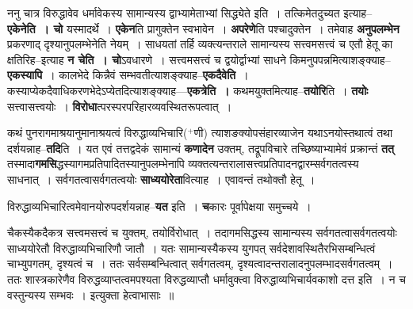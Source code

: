 \documentclass[article,12pt,a4paper]{memoir}
\newcommand{\add}[1]{($^{+}$#1)}
\begin{document}
	  \pstart ननु चात्र विरुद्धावेव धर्मावेकस्य सामान्यस्य द्वाभ्यामेताभ्यां सिद्ध्येते इति । तत्किमेतदुच्यत इत्याह--\textbf{एकेनेति । चो} यस्मादर्थे । \textbf{एकेन}ति प्रागुक्तेन स्वभावेन । \textbf{अपरेणे}ति पश्चादुक्तेन । तमेवाह \textbf{अनुपलम्भेन} प्रकरणाद् दृश्यानुपलम्भेनेति नेयम् । साधयतां तर्हि व्यक्त्यन्तराले सामान्यस्य सत्त्वमसत्त्वं च एतौ हेतू का क्षतिरिह--इत्याह \textbf{न चेति । चो}ऽवधारणे । सत्त्वमसत्त्वं च द्वयोर्द्वाभ्यां साधने किमनुपपन्नमित्याशङ्क्याह--\textbf{एकस्यापि} । कालभेदे किन्नैवं सम्भवतीत्याशङ्क्याह--\textbf{एकदैवेति} । कस्याप्येकदैवाधिकरणभेदेऽप्येतदित्याशङ्क्याह—\textbf{एकत्रेति ।} कथमयुक्तमित्याह--\textbf{तयोरि}ति । \textbf{तयोः} सत्त्वासत्त्वयोः । \textbf{विरोधा}त्परस्परपरिहारव्यवस्थितरूपत्वात् ।
	\pend
      

	  \pstart कथं पुनरागमाश्रयानुमानाश्रयत्वं विरुद्धाव्यभिचारि\add{णी} त्याशङक्योपसंहारव्याजेन यथाऽनयोस्तथात्वं तथा दर्शयन्नाह--\textbf{तदि}ति । यत एवं तत्तद्वदेकं सामान्यं \textbf{कणादेन} उक्तम्, तद्रूपविचारे तच्छिष्याभ्यामेवं प्रक्रान्तं \textbf{तत्} तस्मादा\textbf{गमसि}द्धस्यागमप्रतिपादितस्यानुपलम्भेनापि व्यक्तत्यन्तरालासत्त्वप्रतिपादनद्वारम्सर्वगतत्वस्य साधनात् । सर्वगतत्वासर्वगतत्वयोः \textbf{साध्ययोरेता}वित्याह । एवावन्तं  तथोक्तौ हेतू ।
	\pend
      

	  \pstart विरुद्धाव्यभिचारित्वमेवानयोरुपदर्शयन्नाह--\textbf{यत} इति । \textbf{च}कारः पूर्वापेक्षया समुच्चये ।  \leavevmode{} 
	  
	चैकस्यैकदैकत्र सत्त्वमसत्त्वं च युक्तम्, तयोर्विरोधात् । तदागमसिद्धस्य सामान्यस्य सर्वगतत्वासर्वगतत्वयोः साध्ययोरेतौ विरुद्धाव्यभिचारिणौ जातौ । यतः सामान्यस्यैकस्य युगपत् सर्वदेशावस्थितैरभिसम्बन्धित्वं चाभ्युपगतम्, दृश्यत्वं च । ततः सर्वसम्बन्धित्वात् सर्वगतत्वम्, दृश्यत्वादन्तरालादनुपलम्भादसर्वगतत्वम् । ततः शास्त्रकारेणैव विरुद्धव्याप्तत्वमपश्यता विरुद्धव्याप्तौ धर्मावुक्त्वा विरुद्धाव्यभिचार्यवकाशो दत्त इति । न च वस्तुन्यस्य सम्भवः । इत्युक्ता हेत्वाभासाः ॥  
	  
\end{document}
